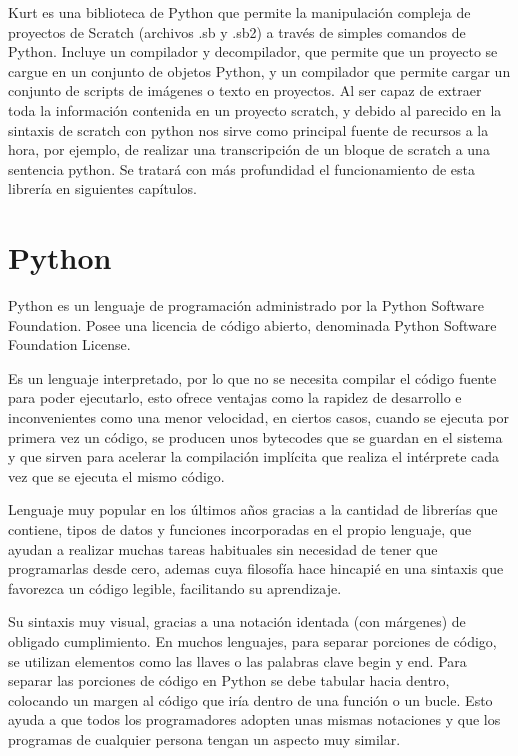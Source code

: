 Kurt es una biblioteca de Python que permite la manipulación compleja de proyectos de Scratch (archivos .sb y .sb2) a través de simples comandos de Python. Incluye un compilador y decompilador, que permite que un proyecto se cargue en un conjunto de objetos Python, y un compilador que permite cargar un conjunto de scripts de imágenes o texto en proyectos.
Al ser capaz de extraer toda la información contenida en un proyecto scratch, y debido al parecido en la sintaxis de scratch con python nos sirve como principal fuente de recursos a la hora, por ejemplo, de realizar una transcripción de un bloque de scratch a una sentencia python.
Se tratará con más profundidad el funcionamiento de esta librería en siguientes capítulos.


\section{Python}
\label{sec:python}
 
Python es un lenguaje de programación administrado por la Python Software Foundation. Posee una licencia de código abierto, denominada Python Software Foundation License.

Es un lenguaje interpretado, por lo que no se necesita compilar el código fuente para poder ejecutarlo, esto ofrece ventajas como la rapidez de desarrollo e inconvenientes como una menor velocidad, en ciertos casos, cuando se ejecuta por primera vez un código, se producen unos bytecodes que se guardan en el sistema y que sirven para acelerar la compilación implícita que realiza el intérprete cada vez que se ejecuta el mismo código. 

Lenguaje muy popular en los últimos años gracias a la cantidad de librerías que contiene, tipos de datos y funciones incorporadas en el propio lenguaje, que ayudan a realizar muchas tareas habituales sin necesidad de tener que programarlas desde cero, ademas cuya filosofía hace hincapié en una sintaxis que favorezca un código legible, facilitando su aprendizaje.

Su sintaxis muy visual, gracias a una notación identada (con márgenes) de obligado cumplimiento. En muchos lenguajes, para separar porciones de código, se utilizan elementos como las llaves o las palabras clave begin y end. Para separar las porciones de código en Python se debe tabular hacia dentro, colocando un margen al código que iría dentro de una función o un bucle. Esto ayuda a que todos los programadores adopten unas mismas notaciones y que los programas de cualquier persona tengan un aspecto muy similar. 


